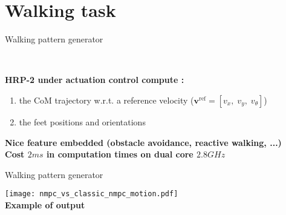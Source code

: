 \section{Walking task}

\setcounter{subsection}{1}
\begin{frame}{Walking pattern generator}

  \begin{center}
    \scalebox{1.0}{} \\
  \end{center}

  \textbf{\color{blue}HRP-2 under actuation control compute : }
    \begin{enumerate}
    \item the CoM trajectory w.r.t. a
        reference velocity ($\mathbf{v}^{\mathrm{ref}} = [v_x,\;v_y,\;v_\theta] $)
    \item the feet positions and orientations
    \end{enumerate}
  \textbf{\color{blue}Nice feature embedded (obstacle avoidance, reactive walking, ...)}\\
  \textbf{\color{blue}Cost $2ms$ in computation times on dual core $2.8GHz$}
\end{frame}


\begin{frame}{Walking pattern generator}
  \begin{center}
    \hspace*{-0.5cm}
    \texttt{[image: nmpc\_vs\_classic\_nmpc\_motion.pdf]}\\
    \textbf{\color{blue} Example of output}
  \end{center}
\end{frame}

